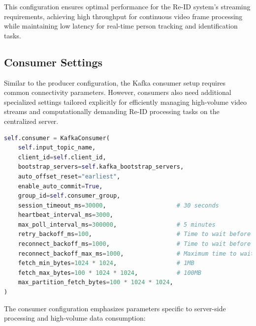 This configuration ensures optimal performance for the Re-ID system's streaming requirements, achieving high throughput for continuous video frame processing while maintaining low latency for real-time person tracking and identification tasks.

\subsection{Consumer Settings}

Similar to the producer configuration, the Kafka consumer setup requires common connectivity parameters. However, consumers also need additional specialized settings tailored explicitly for efficiently managing high-volume video streams and computationally demanding Re-ID processing tasks on the centralized server.\\



\begin{lstlisting}[language=Python, caption={Kafka consumer configuration for centralized server}]
self.consumer = KafkaConsumer(
    self.input_topic_name,
    client_id=self.client_id,
    bootstrap_servers=self.kafka_bootstrap_servers,
    auto_offset_reset="earliest",
    enable_auto_commit=True,
    group_id=self.consumer_group,
    session_timeout_ms=30000,                    # 30 seconds
    heartbeat_interval_ms=3000,
    max_poll_interval_ms=300000,                 # 5 minutes
    retry_backoff_ms=100,                        # Time to wait before retrying
    reconnect_backoff_ms=1000,                   # Time to wait before reconnecting
    reconnect_backoff_max_ms=1000,               # Maximum time to wait before reconnecting
    fetch_min_bytes=1024 * 1024,                 # 1MB
    fetch_max_bytes=100 * 1024 * 1024,           # 100MB
    max_partition_fetch_bytes=100 * 1024 * 1024,
)
\end{lstlisting}

The consumer configuration emphasizes parameters specific to server-side processing and high-volume data consumption:

